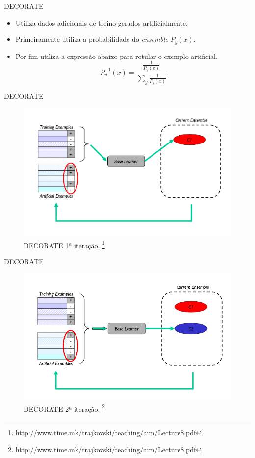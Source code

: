 \documentclass[brazil]{beamer}
\begin{document}
\begin{frame}{DECORATE}
   \begin{itemize}
\justifying
      \item Utiliza dados adicionais de treino gerados artificialmente.
\end{itemize}
      \begin{itemize}
\justifying
      \item <1 ->Primeiramente utiliza a probabilidade do \textit{ensemble} $P_y(x)$.
      \item <2 ->Por fim utiliza a expressão abaixo para rotular o exemplo artificial.
\begin{equation}
     P_{y}^{-1}(x) = \frac{\frac{1}{P_y(x)}}{\sum\limits_y \frac{1}{P_y(x)}}
     \label{eq:decorate}
   \end{equation}
   \end{itemize}
\end{frame}

\begin{frame}{DECORATE}
   \begin{figure}[!htb] \centering 
     \centering
     \includegraphics[width=.8\columnwidth]{slide/decorate1} 
     \caption{DECORATE 1ª iteração. \footnote[frame]{\url{http://www.time.mk/trajkovski/teaching/aim/Lecture8.pdf}}} 
     \label{fig:decorate1}
   \end{figure}
\end{frame}

\begin{frame}{DECORATE}
\begin{figure}[!htb] \centering 
  \centering
  \includegraphics[width=.8\columnwidth]{slide/decorate2} 
  \caption{DECORATE 2ª iteração. \footnote[frame]{\url{http://www.time.mk/trajkovski/teaching/aim/Lecture8.pdf}}} 
  \label{fig:decorate2}
\end{figure}
\end{frame}
\end{document}
